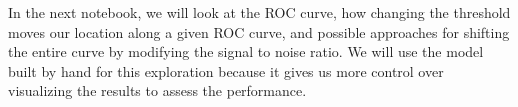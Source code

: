 \documentclass[11pt]{article}
\begin{document}
In the next notebook, we will look at the ROC curve, how changing the
threshold moves our location along a given ROC curve, and possible
approaches for shifting the entire curve by modifying the signal to
noise ratio. We will use the model built by hand for this exploration
because it gives us more control over visualizing the results to assess
the performance.


    
    
    
    
\end{document}
